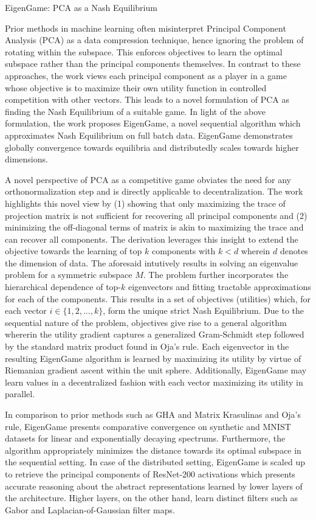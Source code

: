 \documentclass[11pt,letterpaper]{article}
\begin{document}
\begin{center}
  \large{EigenGame: PCA as a Nash Equilibrium}
\end{center}

Prior methods in machine learning often misinterpret Principal Component Analysis (PCA) as a data compression technique, hence ignoring the problem of rotating within the subspace. This enforces objectives to learn the optimal subspace rather than the principal components themselves. In contrast to these approaches, the work views each principal component as a player in a game whose objective is to maximize their own utility function in controlled competition with other vectors. This leads to a novel formulation of PCA as finding the Nash Equilibrium of a suitable game. In light of the above formulation, the work proposes EigenGame, a novel sequential algorithm which approximates Nash Equilibrium on full batch data. EigenGame demonstrates globally convergence towards equilibria and distributedly scales towards higher dimensions. 

A novel perspective of PCA as a competitive game obviates the need for any orthonormalization step and is directly applicable to decentralization. The work highlights this novel view by (1) showing that only maximizing the trace of projection matrix is not sufficient for recovering all principal components and (2) minimizing the off-diagonal terms of matrix is akin to maximizing the trace and can recover all components. The derivation leverages this insight to extend the objective towards the learning of top $k$ components with $k < d$ wherein $d$ denotes the dimension of data. The aforesaid intutively results in solving an eigenvalue problem for a symmetric subspace $M$. The problem further incorporates the hierarchical dependence of top-$k$ eigenvectors and fitting tractable approximations for each of the components. This results in a set of objectives (utilities) which, for each vector $i \in \{1,2,...,k\}$, form the unique strict Nash Equilibrium. Due to the sequential nature of the problem, objectives give rise to a general algorithm whererin the utility gradient captures a generalized Gram-Schmidt step followed by the standard matrix product found in Oja's rule. Each eigenvector in the resulting EigenGame algorithm is learned by maximizing its utility by virtue of Riemanian gradient ascent within the unit sphere. Additionally, EigenGame may learn values in a decentralized fashion with each vector maximizing its utility in parallel. 

In comparison to prior methods such as GHA and Matrix Krasulinas and Oja's rule, EigenGame presents comparative convergence on synthetic and MNIST datasets for linear and exponentially decaying spectrums. Furthermore, the algorithm appropriately minimizes the distance towards its optimal subspace in the sequential setting. In case of the distributed setting, EigenGame is scaled up to retrieve the principal components of ResNet-200 activations which presents accurate reasoning about the abstract representations learned by lower layers of the architecture. Higher layers, on the other hand, learn distinct filters such as Gabor and Laplacian-of-Gaussian filter maps. 
\end{document}
